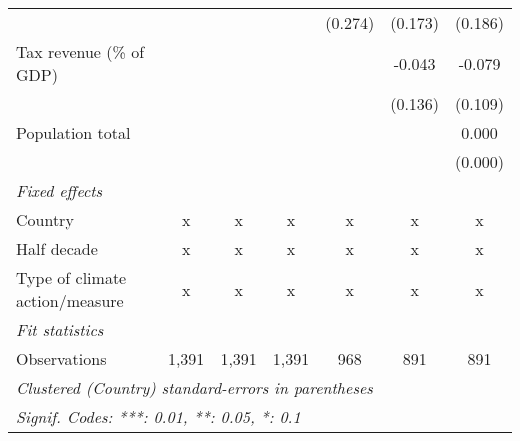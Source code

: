 \begin{tabular}{lcccccc}
                                                       &               &                &                & (0.274)       & (0.173)       & (0.186)\\   
   Tax revenue (\% of GDP)                             &               &                &                &               & -0.043        & -0.079\\   
                                                       &               &                &                &               & (0.136)       & (0.109)\\   
   Population total                                    &               &                &                &               &               & 0.000\\   
                                                       &               &                &                &               &               & (0.000)\\   
   \emph{Fixed effects}\\
   Country                                             & x             & x              & x              & x             & x             & x\\  
   Half decade                                         & x             & x              & x              & x             & x             & x\\  
   Type of climate action/measure                      & x             & x              & x              & x             & x             & x\\  
   \midrule \emph{Fit statistics}\\
   Observations                                        & 1,391         & 1,391          & 1,391          & 968           & 891           & 891\\  
   \midrule
   \multicolumn{7}{l}{\emph{Clustered (Country) standard-errors in parentheses}}\\
   \multicolumn{7}{l}{\emph{Signif. Codes: ***: 0.01, **: 0.05, *: 0.1}}\\
\end{tabular}
\par\endgroup


